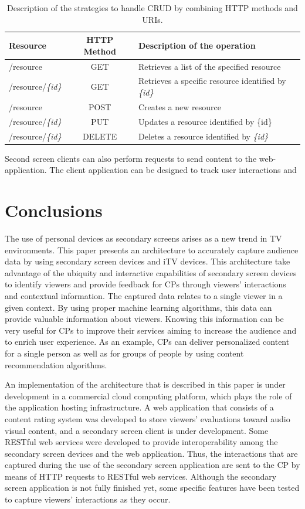 \documentclass[journal]{IEEEtran}
\begin{document}
\begin{table}[!t]
	\label{tab_web_services_design}
	\renewcommand{\arraystretch}{1.3}
	\caption{Description of the strategies to handle CRUD by combining HTTP methods and URIs.}
	\centering
	\begin{tabular}{|l|c|p{3.5cm}|}
		\hline
		\bfseries Resource & \bfseries HTTP Method & \bfseries Description of the operation
		\tabularnewline\hline
		/resource & GET& Retrieves a list of the specified resource 
		\tabularnewline\hline
		/resource/\emph{\{id\}} & GET & Retrieves a specific resource identified by \emph{\{id\}}
		\tabularnewline\hline
		/resource & POST & Creates a new resource 
		\tabularnewline
		\hline
		/resource/\emph{\{id\}} & PUT & Updates a resource identified by \{id\}
		\tabularnewline
		\hline
		/resource/\emph{\{id\}} & DELETE & Deletes a resource identified by \emph{\{id\}}
		\tabularnewline
		\hline
	\end{tabular}
\end{table}

Second screen clients can also perform requests to send content to the web-application. The client application can be designed to track user interactions and 



\section{Conclusions}

The use of personal devices as secondary screens arises as a new trend in TV environments. This paper presents an architecture to accurately capture audience data by using secondary screen devices and iTV devices. This architecture take advantage of the ubiquity and interactive capabilities of secondary screen devices to identify viewers and provide feedback for CPs through viewers' interactions and contextual information. The captured data relates to a single viewer in a given context. By using proper machine learning algorithms, this data can provide valuable information about viewers. Knowing this information can be very useful for CPs to improve their services aiming to increase the audience and to enrich user experience. As an example, CPs can deliver personalized content for a single person as well as for groups of people by using content recommendation algorithms.

An implementation of the architecture that is described in this paper is under development in a commercial cloud computing platform, which plays the role of the application hosting infrastructure. A web application that consists of a content rating system was developed to store  viewers' evaluations toward audio visual content, and a secondary screen client is under development. Some RESTful web services were developed to provide interoperability among the secondary screen devices and the web application. Thus, the interactions that are captured during the use of the secondary screen application are sent to the CP by means of HTTP requests to RESTful web services. Although the secondary screen application is not fully finished yet, some specific features have been tested to capture viewers' interactions as they occur.
\end{document}
